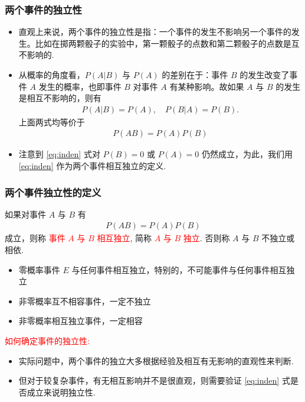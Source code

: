 \begin{frame}
  \frametitle{两个事件的独立性}
  \begin{itemize}[<+-|alert@+>]
  \item 直观上来说，两个事件的独立性是指：一个事件的发生不影响另一个事件的发生。比如在掷两颗骰子的实验中，第一颗骰子的点数和第二颗骰子的点数是互不影响的.
  \item 从概率的角度看，$P (A|B)$ 与 $P (A)$ 的差别在于：事件 $B$ 的发生改变了事件 $A$ 发生的概率，也即事件 $B$ 对事件 $A$ 有某种影响。故如果 $A$ 与 $B$ 的发生是相互不影响的，则有 \pause
    \begin{eqnarray*}
      P(A|B)=P(A),\quad P(B|A)=P(B).
    \end{eqnarray*}
    \pause 上面两式均等价于
    \begin{eqnarray}\label{eq:inden}
      P(AB)=P(A)P(B)
    \end{eqnarray}
  \item 注意到 \eqref{eq:inden} 式对 $P (B)=0$ 或 $P (A)=0$ 仍然成立，为此，我们用 \eqref{eq:inden} 作为两个事件相互独立的定义.
  \end{itemize}
\end{frame}

\begin{frame}
  \frametitle{两个事件独立性的定义}
  \begin{defi}
    如果对事件 $A$ 与 $B$ 有
    \begin{eqnarray*}
      P(AB)=P(A)P(B)
    \end{eqnarray*}
    成立，则称 \textcolor{red}{事件 $A$ 与 $B$ 相互独立}, 简称 \textcolor{red}{$A$ 与 $B$ 独立}. 否则称 $A$ 与 $B$ 不独立或相依.
  \end{defi}

\begin{rmk}
	\begin{itemize}
		\item 零概率事件 $E$ 与任何事件相互独立，特别的，不可能事件与任何事件相互独立
        \item 非零概率互不相容事件，一定不独立
        \item 非零概率相互独立事件，一定相容
\end{itemize}


\end{rmk}

\pause
  \textcolor{red}{如何确定事件的独立性: }
  \begin{itemize}[<+-|alert@+>]
  \item 实际问题中，两个事件的独立大多根据经验及相互有无影响的直观性来判断.
  \item 但对于较复杂事件，有无相互影响并不是很直观，则需要验证 \eqref{eq:inden} 式是否成立来说明独立性.
  \end{itemize}
\end{frame}



